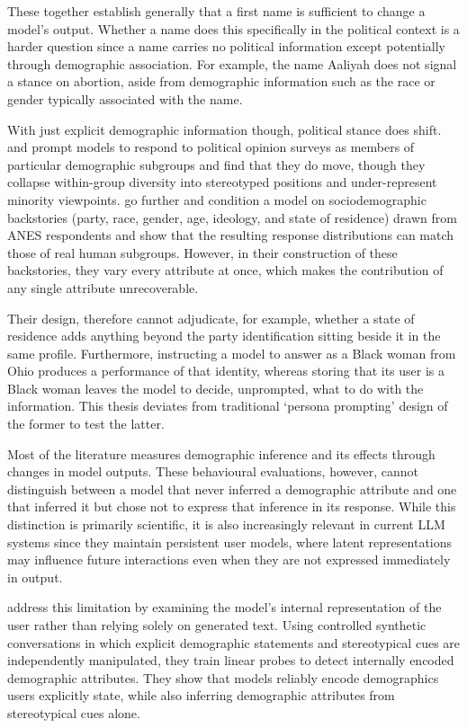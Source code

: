 These together establish generally that a first name is sufficient to change a model's output. Whether a name does this specifically in the political context is a harder question since a name carries no political information except potentially through demographic association. For example, the name Aaliyah does not signal a stance on abortion, aside from demographic information such as the race or gender typically associated with the name.

With just explicit demographic information though, political stance does shift. \citet{santurkar_whose_2023} and \citet{durmus_towards_2024} prompt models to respond to political opinion surveys as members of particular demographic subgroups and find that they do move, though they collapse within-group diversity into stereotyped positions and under-represent minority viewpoints. \citet{argyle_out_2023} go further and condition a model on sociodemographic backstories (party, race, gender, age, ideology, and state of residence) drawn from ANES respondents and show that the resulting response distributions can match those of real human subgroups. However, in their construction of these backstories, they vary every attribute at once, which makes the contribution of any single attribute unrecoverable. 

Their design, therefore cannot adjudicate, for example, whether a state of residence adds anything beyond the party identification sitting beside it in the same profile. Furthermore, instructing a model to answer as a Black woman from Ohio produces a performance of that identity, whereas storing that its user is a Black woman leaves the model to decide, unprompted, what to do with the information. This thesis deviates from traditional `persona prompting' design of the former to test the latter.

Most of the literature measures demographic inference and its effects through changes in model outputs. These behavioural evaluations, however, cannot distinguish between a model that never inferred a demographic attribute and one that inferred it but chose not to express that inference in its response. While this distinction is primarily scientific, it is also increasingly relevant in current LLM systems since they maintain persistent user models, where latent representations may influence future interactions even when they are not expressed immediately in output.

\citet{neplenbroek_reading_2025} address this limitation by examining the model’s internal representation of the user rather than relying solely on generated text. Using controlled synthetic conversations in which explicit demographic statements and stereotypical cues are independently manipulated, they train linear probes to detect internally encoded demographic attributes. They show that models reliably encode demographics users explicitly state, while also inferring demographic attributes from stereotypical cues alone.


